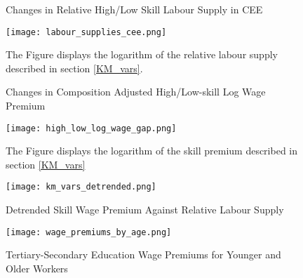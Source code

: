 \documentclass[11pt]{article}
\begin{document}
\begin{figure}[!htbp]%
        \centering
        \caption{Changes in Relative High/Low Skill Labour Supply in CEE}
        {\texttt{[image: labour\_supplies\_cee.png]}}
        \label{labour_supplies_cee}
        \caption*{\footnotesize The Figure displays the logarithm of the relative labour supply described in section \ref{KM_vars}.}
\end{figure}

\begin{figure}[!htbp]%
    \centering
    \caption{Changes in Composition Adjusted High/Low-skill Log Wage Premium}
    {\texttt{[image: high\_low\_log\_wage\_gap.png]}}
    \label{high_low_log_wage_gap}
    \caption*{\footnotesize The Figure displays the logarithm of the skill premium described in section \ref{KM_vars}}
\end{figure}


\begin{figure}[!htbp]%
    \centering
    \caption{Detrended Skill Wage Premium Against Relative Labour Supply}
    {\texttt{[image: km\_vars\_detrended.png]} }
    \label{km_vars_detrended}
\end{figure}


\begin{figure}[!htbp]%
    \centering
    \caption{Tertiary-Secondary Education Wage Premiums for Younger and Older Workers}
    {\texttt{[image: wage\_premiums\_by\_age.png]} }
    \label{wage_premiums_by_age}
\end{figure}


\FloatBarrier
\end{document}
